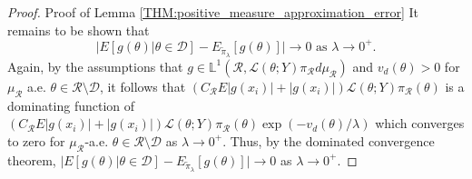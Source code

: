 \documentclass[10pt,fleqn]{article}
\DeclareMathOperator{\1}{\mathbbm{1}}
\begin{document}
\begin{proof}{Proof of Lemma \ref{THM:positive_measure_approximation_error}}
It remains to be shown that $$\big| E[g(\theta)|\theta\in\mathcal{D}]-E_{\tilde{\pi}_\lambda}[g(\theta)]\big| \to 0 \text{ as }\lambda\to0^+.$$
Again, by the assumptions that $g\in\mathbb{L}^1(\mathcal{R},\mathcal{L}(\theta;Y)\pi_\mathcal{R}d\mu_\mathcal{R})$ and $v_d(\theta) >0$ for $\mu_\mathcal{R}$ a.e.  $\theta \in \mathcal{R}\setminus \mathcal{D}$, it follows that $(C_\mathcal{R}E|g(x_i)|+|g(x_i)|) \mathcal{L}(\theta;Y)\pi_\mathcal{R}(\theta)$ is a dominating function of $(C_\mathcal{R}E|g(x_i)|+|g(x_i)|) \mathcal{L}(\theta;Y)\pi_\mathcal{R}(\theta)\exp(-v_d(\theta)/\lambda )$ which converges to zero for $\mu_\mathcal{R}$-a.e. $\theta\in\mathcal{R}\setminus\mathcal{D}$ as $\lambda\to 0^+.$ Thus, by the dominated convergence theorem, $\big| E[g(\theta)|\theta\in\mathcal{D}]-E_{\tilde{\pi}_\lambda}[g(\theta)]\big|\to 0$ as $\lambda\to0^+.$

\end{proof}
\end{document}
